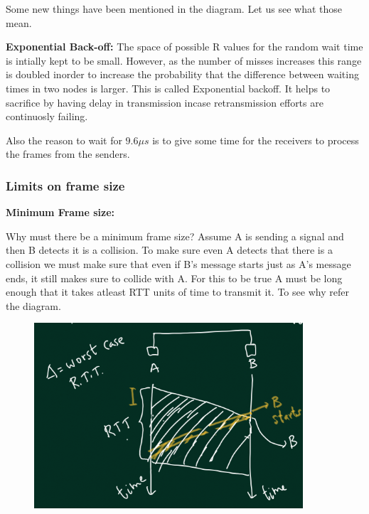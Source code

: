 \documentclass[12pt]{article}
\newcommand{\tbox}[1]{\noindent\fbox{\parbox{\textwidth}{#1}}}
\begin{document}
Some new things have been mentioned in the diagram. Let us see what those mean. 

\textbf{Exponential Back-off:} The space of possible R values for the random wait time is intially kept to be small. 
However, as the number of misses increases this range is doubled inorder to increase the probability that the difference between waiting times
in two nodes is larger. This is called Exponential backoff. It helps to sacrifice by having delay in transmission incase retransmission efforts are continuosly 
failing.  

Also the reason to wait for \(9.6\mu s\) is to give some time for the receivers to process the frames from the senders. 


\noindent\tbox{
    \begin{center}
    \textbf{\Huge Lecture 16}
    \end{center}
}

\subsubsection{Limits on frame size}

\textbf{Minimum Frame size:}

Why must there be a minimum frame size? Assume A is sending a signal and then B detects it is a collision. To make 
sure even A detects that there is a collision we must make sure that even if B's message starts just as A's message ends, 
it still makes sure to collide with A. For this to be true A must be long enough that it 
takes atleast RTT units of time to transmit it. To see why refer the diagram. 


\begin{figure}[H]
    \centering
    \includegraphics*[width=10cm]{Diagrams/min_frame.png}
\end{figure}
\end{document}
